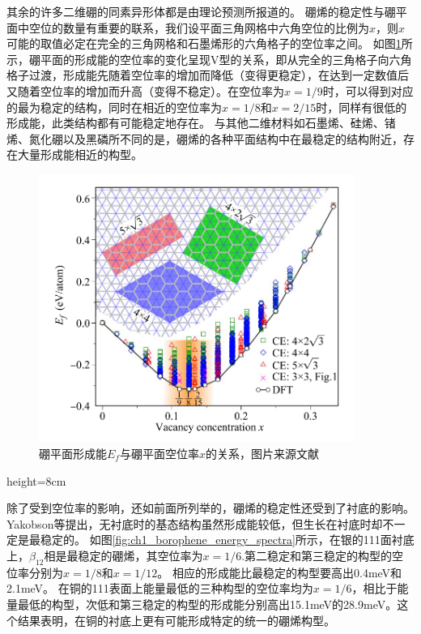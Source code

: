 其余的许多二维硼的同素异形体都是由理论预测所报道的\cite{liu2018intermixing, liu2013probing, penev2012polymorphism, zhang2017elasticity, zhao2016superconductivity, yang2008ab, zhang2016polyphony, tsafack2016thermomechanical, zhang2016substrate, ma2016graphene}。
硼烯的稳定性与硼平面中空位的数量有重要的联系，我们设平面三角网格中六角空位的比例为$x$，则$x$可能的取值必定在完全的三角网格和石墨烯形的六角格子的空位率之间。
如图\ref{fig:ch1_formation_boronphenes}所示，硼平面的形成能的空位率的变化呈现V型的关系，即从完全的三角格子向六角格子过渡，形成能先随着空位率的增加而降低（变得更稳定），在达到一定数值后又随着空位率的增加而升高（变得不稳定）。在空位率为$x=1/9$时，可以得到对应的最为稳定的结构，同时在相近的空位率为$x=1/8$和$x=2/15$时，同样有很低的形成能，此类结构都有可能稳定地存在。
与其他二维材料如石墨烯、硅烯、锗烯、氮化硼以及黑磷所不同的是，硼烯的各种平面结构中在最稳定的结构附近，存在大量形成能相近的构型。

\begin{figure}
  \includegraphics[width=0.92\textwidth]{figs/ch1_formation_boronphenes.png}
  \centering
  \caption{硼平面形成能$E_f$与硼平面空位率$x$的关系，图片来源文献\cite{penev2012polymorphism}}
  \label{fig:ch1_formation_boronphenes}
\end{figure}height=8cm

除了受到空位率的影响，还如前面所列举的，硼烯的稳定性还受到了衬底的影响。
Yakobson等提出\cite{zhang2015two}，无衬底时的基态结构虽然形成能较低，但生长在衬底时却不一定是最稳定的。
如图\ref{fig:ch1_borophene_energy_spectra}所示，在银的111面衬底上，$\beta_{12}$相是最稳定的硼烯，其空位率为$x=1/6$.第二稳定和第三稳定的构型的空位率分别为$x=1/8$和$x=1/12$。
相应的形成能比最稳定的构型要高出0.4meV和2.1meV。
在铜的111表面上能量最低的三种构型的空位率均为$x=1/6$，相比于能量最低的构型，次低和第三稳定的构型的形成能分别高出15.1meV的28.9meV\cite{zhang2015two}。这个结果表明，在铜的衬底上更有可能形成特定的统一的硼烯构型。

